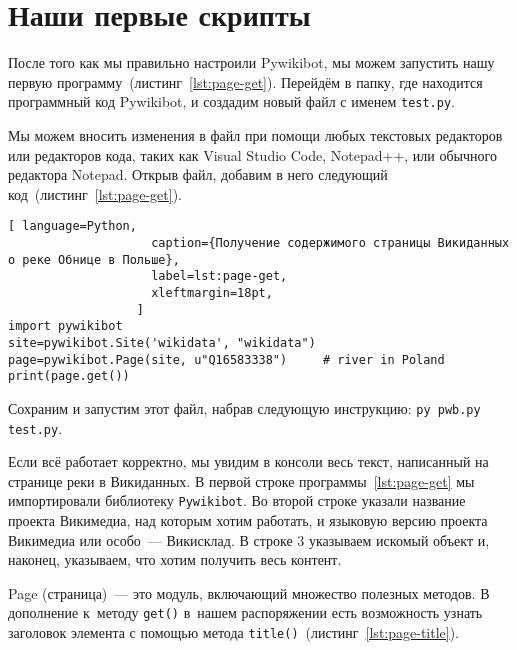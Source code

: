 \section{Наши первые скрипты}

\label{sec:firstScript}
После того как мы правильно настроили Pywikibot, мы можем запустить 
нашу первую программу~(листинг~\ref{lst:page-get}). 
Перейдём в папку, где находится программный код Pywikibot, 
и создадим новый файл с именем \lstinline|test.py|.

Мы можем вносить изменения в файл при помощи любых текстовых редакторов 
или редакторов кода, таких как 
Visual Studio Code, Notepad++, или обычного редактора Notepad. 
Открыв файл, добавим в него следующий код~(листинг~\ref{lst:page-get}).

%
\begin{lstlisting}[ language=Python,
                    caption={Получение содержимого страницы Викиданных о реке Обнице в Польше},
                    label=lst:page-get,
                    xleftmargin=18pt, 
                  ]
import pywikibot
site=pywikibot.Site('wikidata', "wikidata")
page=pywikibot.Page(site, u"Q16583338")     # river in Poland
print(page.get())
\end{lstlisting}

Сохраним и запустим этот файл, набрав следующую инструкцию: \lstinline|py pwb.py test.py|.

Если всё работает корректно, мы увидим в консоли весь текст, 
написанный на странице реки  в Викиданных. 
В первой строке программы~\ref{lst:page-get} мы импортировали библиотеку \lstinline|Pywikibot|. 
Во второй строке указали название проекта Викимедиа, над которым хотим работать, 
и языковую версию проекта Викимедиа или особо~--- Викисклад. 
%
В строке 3 указываем искомый объект и, наконец, указываем, что хотим получить весь контент.


Page (страница)~--- это модуль, включающий множество полезных методов. 
%
В дополнение к~методу \lstinline|get()| в~нашем распоряжении есть возможность 
узнать заголовок элемента с помощью метода \lstinline|title()|~(листинг~\ref{lst:page-title}).

